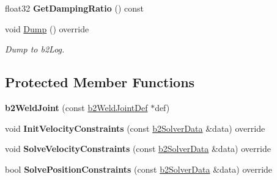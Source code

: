 \begin{DoxyCompactItemize}
\mbox{\label{classb2_weld_joint_a603d83491d474156b2c09b59a23bfca4}} 
float32 {\bfseries Get\+Damping\+Ratio} () const
\item 
\mbox{\label{classb2_weld_joint_a59de1cad3229b41886bc23c4d6216e2f}} 
void \hyperlink{classb2_weld_joint_a59de1cad3229b41886bc23c4d6216e2f}{Dump} () override
\begin{DoxyCompactList}\small\item\em Dump to b2\+Log. \end{DoxyCompactList}\end{DoxyCompactItemize}
\subsection*{Protected Member Functions}
\begin{DoxyCompactItemize}
\item 
\mbox{\label{classb2_weld_joint_a84dbb52e983d9039eab6ad64ae62d8eb}} 
{\bfseries b2\+Weld\+Joint} (const \hyperlink{structb2_weld_joint_def}{b2\+Weld\+Joint\+Def} $\ast$def)
\item 
\mbox{\label{classb2_weld_joint_afb54f848fe19f33555f01594e3e4f410}} 
void {\bfseries Init\+Velocity\+Constraints} (const \hyperlink{structb2_solver_data}{b2\+Solver\+Data} \&data) override
\item 
\mbox{\label{classb2_weld_joint_a0367580735b117dcf9a4292df4daf883}} 
void {\bfseries Solve\+Velocity\+Constraints} (const \hyperlink{structb2_solver_data}{b2\+Solver\+Data} \&data) override
\item 
\mbox{\label{classb2_weld_joint_a068ae45ce6577e27669121032c277015}} 
bool {\bfseries Solve\+Position\+Constraints} (const \hyperlink{structb2_solver_data}{b2\+Solver\+Data} \&data) override
\end{DoxyCompactItemize}

